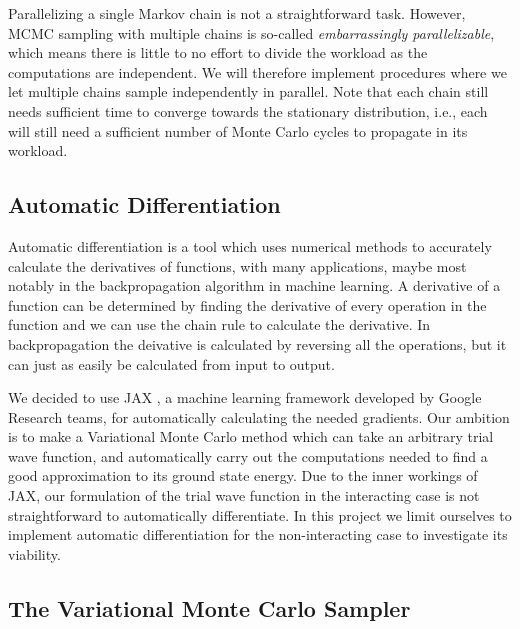 Parallelizing a single Markov chain is not a straightforward task. However, MCMC sampling with multiple chains is so-called \textit{embarrassingly parallelizable}, which means there is little to no effort to divide the workload as the computations are independent. We will therefore implement procedures where we let multiple chains sample independently in parallel. Note that each chain still needs sufficient time to converge towards the stationary distribution, i.e., each will still need a sufficient number of Monte Carlo cycles to propagate in its workload. 

\subsection{Automatic Differentiation}

Automatic differentiation is a tool which uses numerical methods to accurately calculate the derivatives of functions, with many applications, maybe most notably in the backpropagation algorithm in machine learning. A derivative of a function can be determined by finding the derivative of every operation in the function and we can use the chain rule to calculate the derivative. In backpropagation the deivative is calculated by reversing all the operations, but it can just as easily be calculated from input to output.

We decided to use JAX \citep{jax2018github}, a machine learning framework developed by Google Research teams, for automatically calculating the needed gradients. Our ambition is to make a Variational Monte Carlo method which can take an arbitrary trial wave function, and automatically carry out the computations needed to find a good approximation to its ground state energy. Due to the inner workings of JAX, our formulation of the trial wave function in the interacting case is not straightforward to automatically differentiate. 
In this project we limit ourselves to implement automatic differentiation for the non-interacting case to investigate its viability. 

\subsection{The Variational Monte Carlo Sampler}\label{seq:vmc_framework}



